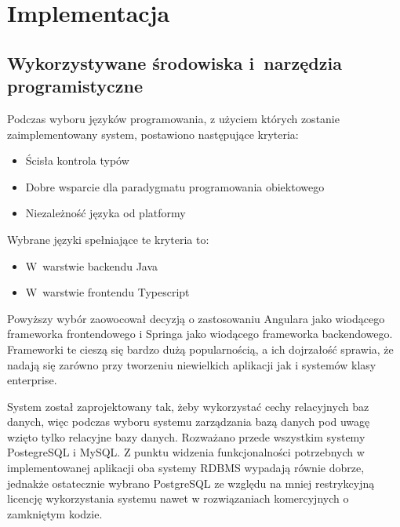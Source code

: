 \chapter{Implementacja}\label{ch:implementation}
\section{Wykorzystywane środowiska i~narzędzia programistyczne}\label{sec:dev-tools}
Podczas wyboru języków programowania, z użyciem których zostanie zaimplementowany system, postawiono następujące kryteria:

\begin{itemize}
    \item Ścisła kontrola typów
    \item Dobre wsparcie dla paradygmatu programowania obiektowego
    \item Niezależność języka od platformy
\end{itemize}

Wybrane języki spełniające te kryteria to:

\begin{itemize}
    \item W~warstwie backendu Java\cite{tech:java}
    \item W~warstwie frontendu Typescript\cite{tech:typescript}
\end{itemize}

Powyższy wybór zaowocował decyzją o zastosowaniu Angulara\cite{tech:angular} jako wiodącego frameworka frontendowego i Springa\cite{tech:spring} jako wiodącego frameworka backendowego.
Frameworki te cieszą się bardzo dużą popularnością, a ich dojrzałość sprawia, że nadają się zarówno przy tworzeniu niewielkich aplikacji jak i systemów klasy enterprise.

\par
{}

\par
System został zaprojektowany tak, żeby wykorzystać cechy relacyjnych baz danych, więc podczas wyboru systemu zarządzania bazą danych pod uwagę wzięto tylko relacyjne bazy danych.
Rozważano przede wszystkim systemy PostegreSQL\cite{tech:postgresql} i MySQL\cite{tech:mysql}. Z punktu widzenia funkcjonalności potrzebnych w implementowanej aplikacji oba systemy RDBMS wypadają równie dobrze, jednakże ostatecznie wybrano PostgreSQL ze względu na mniej restrykcyjną licencję wykorzystania systemu nawet w rozwiązaniach komercyjnych o zamkniętym kodzie.
\par
{}

